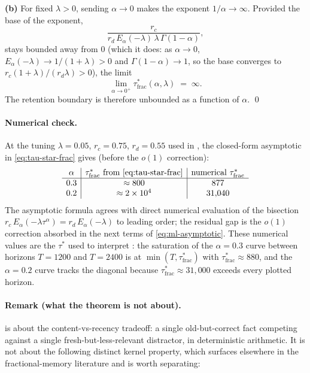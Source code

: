 \documentclass[11pt]{article}
\theoremstyle{plain}
\theoremstyle{definition}
\begin{document}
\textbf{(b)}  For fixed $\lambda > 0$, sending $\alpha
\to 0$ makes the exponent $1/\alpha \to \infty$.
Provided the base of the exponent,
\[
\frac{r_c}{r_d\,E_\alpha(-\lambda)\,\lambda\,
  \Gamma(1-\alpha)},
\]
stays bounded away from $0$ (which it does: as
$\alpha \to 0$, $E_\alpha(-\lambda) \to 1/(1+\lambda)
> 0$ \cite{gorenflo2014ml} and $\Gamma(1-\alpha) \to
1$, so the base converges to $r_c(1+\lambda)/(r_d
\lambda) > 0$), the limit
\[
\lim_{\alpha \to 0^+} \tau^*_{\mathrm{frac}}(\alpha,
\lambda) \;=\; \infty.
\]
The retention boundary is therefore unbounded as a
function of $\alpha$.  \qed

\paragraph{Numerical check.}
At the tuning $\lambda = 0.05$, $r_c = 0.75$,
$r_d = 0.55$ used in , the
closed-form asymptotic in \eqref{eq:tau-star-frac}
gives (before the $o(1)$ correction):
\[
\begin{array}{c|c|c}
\alpha & \tau^*_{\mathrm{frac}} \text{ from
  \eqref{eq:tau-star-frac}} &
  \text{numerical } \tau^*_{\mathrm{frac}} \\
\hline
0.3 & \approx 800 & 877 \\
0.2 & \approx 2 \times 10^4 & 31{,}040 \\
\end{array}
\]
The asymptotic formula agrees with direct numerical
evaluation of the bisection
$r_c\,E_\alpha(-\lambda\tau^\alpha) = r_d\,
E_\alpha(-\lambda)$ to leading order; the residual
gap is the $o(1)$ correction absorbed in the next
terms of \eqref{eq:ml-asymptotic}.  These numerical
values are the $\tau^*$ used to interpret
: the saturation of the
$\alpha = 0.3$ curve between horizons $T = 1200$ and
$T = 2400$ is at $\min(T, \tau^*_{\mathrm{frac}})$ with
$\tau^*_{\mathrm{frac}} \approx 880$, and the
$\alpha = 0.2$ curve tracks the diagonal because
$\tau^*_{\mathrm{frac}} \approx 31{,}000$ exceeds every
plotted horizon.

\paragraph{Remark (what the theorem is not about).}
 is about the content-vs-recency
tradeoff: a single old-but-correct fact competing
against a single fresh-but-less-relevant distractor,
in deterministic arithmetic.  It is not about the
following distinct kernel property, which surfaces
elsewhere in the fractional-memory literature and is
worth separating:
\end{document}
